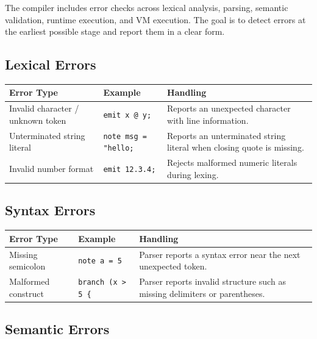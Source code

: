 \documentclass[12pt,a4paper]{article}
\begin{document}
The compiler includes error checks across lexical analysis, parsing, semantic validation, runtime execution, and VM execution. The goal is to detect errors at the earliest possible stage and report them in a clear form.

\subsection*{Lexical Errors}

\begin{table}[H]
\centering
\begin{tabularx}{\textwidth}{l X X}
\toprule
\textnormal{Error Type} & \textnormal{Example} & \textnormal{Handling} \\
\midrule
Invalid character / unknown token & \texttt{emit x @ y;} & Reports an unexpected character with line information. \\
Unterminated string literal & \texttt{note msg = "hello;} & Reports an unterminated string literal when closing quote is missing. \\
Invalid number format & \texttt{emit 12.3.4;} & Rejects malformed numeric literals during lexing. \\
\bottomrule
\end{tabularx}
\end{table}

\subsection*{Syntax Errors}

\begin{table}[H]
\centering
\begin{tabularx}{\textwidth}{l X X}
\toprule
\textnormal{Error Type} & \textnormal{Example} & \textnormal{Handling} \\
\midrule
Missing semicolon & \texttt{note a = 5} & Parser reports a syntax error near the next unexpected token. \\
Malformed construct & \texttt{branch (x > 5 \{} & Parser reports invalid structure such as missing delimiters or parentheses. \\
\bottomrule
\end{tabularx}
\end{table}

\subsection*{Semantic Errors}
\end{document}
